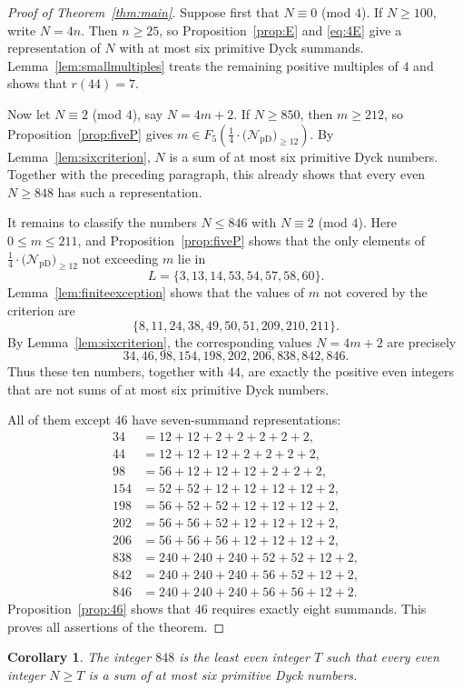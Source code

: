 \documentclass[12pt]{article}
\theoremstyle{plain}
\newtheorem{corollary}[theorem]{Corollary}
\newcommand{\Pset}{\tfrac14\cdot
  \bigl(\mathcal N_{\mathrm{pD}}\bigr)_{\ge 12}}
\begin{document}
\begin{proof}[Proof of Theorem~\ref{thm:main}]
Suppose first that $N\equiv0$ (mod $4$).  If $N\geq100$, write $N=4n$.
Then $n\geq25$, so Proposition~\ref{prop:E} and \eqref{eq:4E} give a
representation of $N$ with at most six primitive Dyck summands.
Lemma~\ref{lem:smallmultiples} treats the remaining positive multiples
of $4$ and shows that $r(44)=7$.

Now let $N\equiv2$ (mod $4$), say $N=4m+2$.  If $N\geq850$, then $m\geq212$,
so Proposition~\ref{prop:fiveP} gives $m\in F_5(\Pset)$.  By
Lemma~\ref{lem:sixcriterion}, $N$ is a sum of at most six primitive
Dyck numbers.  Together with the preceding paragraph, this already
shows that every even $N\geq848$ has such a representation.

It remains to classify the numbers $N\leq846$ with $N\equiv2$ (mod $4$).
Here $0\leq m\leq211$, and Proposition~\ref{prop:fiveP} shows that the
only elements of $\Pset$ not exceeding $m$ lie in
\[
 L=\{3,13,14,53,54,57,58,60\}.
\]
Lemma~\ref{lem:finiteexception} shows that the values of $m$ not
covered by the criterion are
\[
 \{8,11,24,38,49,50,51,209,210,211\}.
\]
By Lemma~\ref{lem:sixcriterion}, the corresponding values $N=4m+2$
are precisely
\[
 34,46,98,154,198,202,206,838,842,846.
\]
Thus these ten numbers, together with $44$, are exactly the positive
even integers that are not sums of at most six primitive Dyck numbers.

All of them except $46$ have seven-summand representations:
\[
\begin{aligned}
34&=12+12+2+2+2+2+2,\\
44&=12+12+12+2+2+2+2,\\
98&=56+12+12+12+2+2+2,\\
154&=52+52+12+12+12+12+2,\\
198&=56+52+52+12+12+12+2,\\
202&=56+56+52+12+12+12+2,\\
206&=56+56+56+12+12+12+2,\\
838&=240+240+240+52+52+12+2,\\
842&=240+240+240+56+52+12+2,\\
846&=240+240+240+56+56+12+2.
\end{aligned}
\]
Proposition~\ref{prop:46} shows that $46$ requires exactly eight
summands.  This proves all assertions of the theorem.
\end{proof}

\begin{corollary}\label{cor:threshold}
The integer $848$ is the least even integer $T$ such that every even
integer $N\geq T$ is a sum of at most six primitive Dyck numbers.
\end{corollary}
\end{document}
